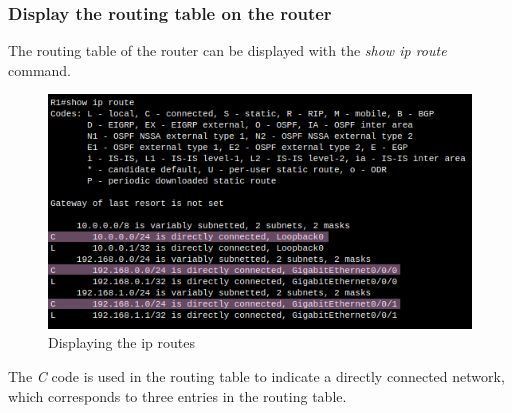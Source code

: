 \documentclass[a4paper]{article}
\newcommand{\abc}{\hfill \break}
\newcommand{\ii}{\textit}
\begin{document}
\subsubsection{Display the routing table on the router}
The routing table of the router can be displayed with the \ii{show ip route} command.
\begin{figure}[h]
	\includegraphics[scale=0.40]{images/show ip route.png}
	\centering
	\caption{Displaying the ip routes}
\end{figure}\abc
The \ii{C} code is used in the routing table to indicate a directly connected network, which corresponds to three entries in the routing table.
\end{document}
